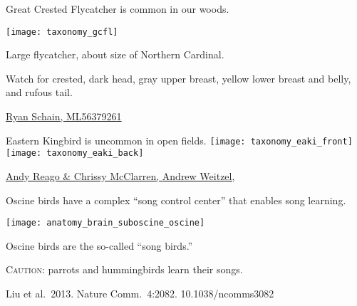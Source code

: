 \documentclass[t]{beamer}
\newcommand{\backoneline}{\vspace{-\baselineskip}}
\begin{document}
\begin{frame}{Great Crested Flycatcher is common in our woods.}
	\backoneline
	
	\begin{multicols}{2}
		\texttt{[image: taxonomy\_gcfl]}
	
		\columnbreak
	
		Large flycatcher, about size of Northern Cardinal.
	
		\bigskip
	
		Watch for crested, dark head,
		gray upper breast,
		yellow lower breast and belly, and
		rufous tail.
	
	\end{multicols}
	
	\tinyfill \href{https://macaulaylibrary.org/asset/56379261}{Ryan Schain, ML56379261}
\end{frame}

\begin{frame}{Eastern Kingbird is uncommon in open fields.}
	\texttt{[image: taxonomy\_eaki\_front]} \hfill
	\texttt{[image: taxonomy\_eaki\_back]}
	
	\vfilll
	
	\tiny \href{https://flickr.com/photos/wildreturn/34996512566}{Andy Reago \& Chrissy McClarren, } \hfill \href{https://flickr.com/photos/21531749@N06/34415322023}{Andrew Weitzel, }
\end{frame}


\begin{frame}{Oscine birds have a complex “song control center” that enables song learning.}

\texttt{[image: anatomy\_brain\_suboscine\_oscine]}

\smallskip

Oscine birds are the so-called “song birds.” 

\smallskip

\textsc{Caution:} parrots and hummingbirds learn their songs.


\tinyfill Liu et al.~2013. Nature Comm.~4:2082. 10.1038/ncomms3082


\end{frame}
\end{document}
